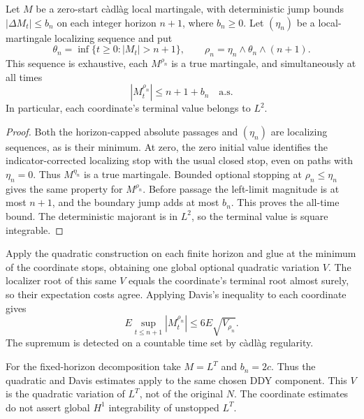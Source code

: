 \begin{lemma}
Let $M$ be a zero-start c\`adl\`ag local martingale, with deterministic
jump bounds $|\Delta M_t|\leq b_n$ on each integer horizon $n+1$, where
$b_n\geq0$. Let $(\eta_n)$ be a local-martingale localizing sequence and put
\[
 \theta_n=\inf\{t\geq0:|M_t|>n+1\},\qquad
 \rho_n=\eta_n\wedge\theta_n\wedge(n+1).
\]
This sequence is exhaustive, each $M^{\rho_n}$ is a true martingale, and
simultaneously at all times
\[
 |M^{\rho_n}_t|\leq n+1+b_n\quad\text{a.s.}
\]
In particular, each coordinate's terminal value belongs to $L^2$.
\end{lemma}
\begin{proof}
Both the horizon-capped absolute passages and $(\eta_n)$ are localizing
sequences, as is their minimum. At zero, the zero initial value identifies
the indicator-corrected localizing stop with the usual closed stop, even
on paths with $\eta_n=0$. Thus $M^{\eta_n}$ is a true martingale.
Bounded optional stopping at $\rho_n\leq\eta_n$ gives the same property
for $M^{\rho_n}$. Before passage the left-limit magnitude is at most
$n+1$, and the boundary jump adds at most $b_n$. This proves the all-time
bound. The deterministic majorant is in $L^2$, so the terminal value is
square integrable.
\end{proof}
Apply the quadratic construction on each finite horizon and glue at the
minimum of the coordinate stops, obtaining one global optional
quadratic variation $V$. The localizer root of this same $V$ equals the
coordinate's terminal root almost surely, so their expectation costs agree.
Applying Davis's inequality to each coordinate gives
\[
 E\sup_{t\leq n+1}|M^{\rho_n}_t|\leq6E\sqrt{V_{\rho_n}}.
\]
The supremum is detected on a countable time set by c\`adl\`ag regularity.

For the fixed-horizon decomposition take $M=L^T$ and $b_n=2c$.
Thus the quadratic and Davis estimates apply to the same chosen DDY component.
This $V$ is the quadratic variation of $L^T$, not of the original $N$.
The coordinate estimates do not assert global $H^1$ integrability of
unstopped $L^T$.
